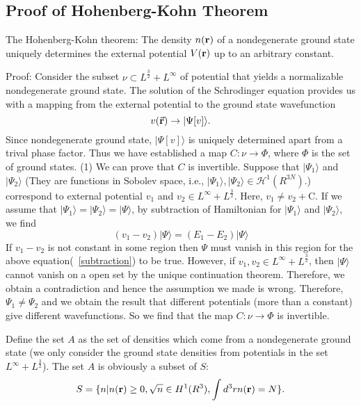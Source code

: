 \chapter{}\label{CHAPETR_A}
\section{Proof of Hohenberg-Kohn Theorem} \label{proof_HK}
The Hohenberg-Kohn theorem: The density $n({\bf r})$ of a nondegenerate ground state uniquely determines the external potential $V({\bf r})$ up to an arbitrary constant.

Proof:
Consider the subset $\mathscr{\nu}\subset L^{\frac{3}{2}}+L^{\infty}$ of potential that yields a normalizable nondegenerate ground state. The solution of the Schrodinger equation provides us with a mapping from the external potential to the ground state wavefunction
\begin{equation}
 v(\vec {\bf r})\rightarrow |\Psi[v]\rangle.
\end{equation}
Since nondegenerate ground state, $|\Psi[v]\rangle$ is uniquely determined apart from a trival phase factor.
Thus we have established a map $C: \mathscr{\nu}\rightarrow \Phi$, where $\Phi$ is the set of ground states.
(1) We can prove that $C$ is invertible. Suppose that $|\Psi_1\rangle$ and $|\Psi_2\rangle$ (They are functions in Sobolev space, i.e.,  $|\Psi_1\rangle, |\Psi_2\rangle \in \mathscr{H}^1(R^{3N})$.) correspond to external potential $v_1$ and $v_2 \in L^{\infty}+L^{\frac{3}{2}}$. Here, $v_1 \neq v_2+\text{C}$. If we assume that $|\Psi_1\rangle=|\Psi_2\rangle=|\Psi\rangle$, by subtraction of Hamiltonian for  $|\Psi_1\rangle$ and $|\Psi_2\rangle$, we find
\begin{equation}
 (v_1-v_2)|\Psi\rangle = (E_1-E_2)|\Psi\rangle
\label{subtraction}
 \end{equation}
If $v_1-v_2$ is  not constant in some region then $\Psi$ must vanish in this region for the above equation(~\ref{subtraction})
to be true. However, if $v_1, v_2 \in L^{\infty}+L^{\frac{3}{2}}$, then $|\Psi\rangle$ cannot vanish on a open set by the unique continuation theorem. Therefore, we obtain a contradiction and hence the assumption we made is wrong. Therefore, $\Psi_1 \neq \Psi_2$ and we obtain the result that different potentials (more than a constant) give different wavefunctions.  So we find that the map $C: \mathscr{\nu}\rightarrow \Phi$ is invertible.

Define the set $A$ as the set of densities which come from a nondegenerate ground state (we only consider the ground 
state densities from potentials in the set $L^{\infty}+L^{\frac{3}{2}}$). The set $A$ is obviously a subset of $S$:
\begin{equation}
S=\{n|n({\bf r})\geq0, \sqrt{n}\in H^1(R^3), \int d^3rn({\bf r})=N\} .
\end{equation}

